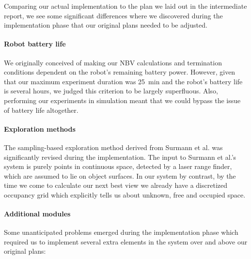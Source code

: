Comparing our actual implementation to the plan we laid out in the intermediate report, we see some significant differences where we discovered during the implementation phase that our original plans needed to be adjusted.

\paragraph{Robot battery life} %
\label{par:robot_battery_life}

We originally conceived of making our NBV calculations and termination conditions dependent on the robot's remaining battery power.
However, given that our maximum experiment duration was \SI{25}{\minute} and the robot's battery life is several hours, we judged this criterion to be largely superfluous.
Also, performing our experiments in simulation meant that we could bypass the issue of battery life altogether.


\paragraph{Exploration methods} %
\label{par:exploration_methods}

The sampling-based exploration method derived from Surmann et al. \cite{surmann2003autonomous} was significantly revised during the implementation.
The input to Surmann et al.'s system is purely points in continuous space, detected by a laser range finder, which are assumed to lie on object surfaces.
In our system by contrast, by the time we come to calculate our next best view we already have a discretized occupancy grid which explicitly tells us about unknown, free and occupied space.


\paragraph{Additional modules} %
\label{par:additional_modules}

Some unanticipated problems emerged during the implementation phase which required us to implement several extra elements in the system over and above our original plans:

